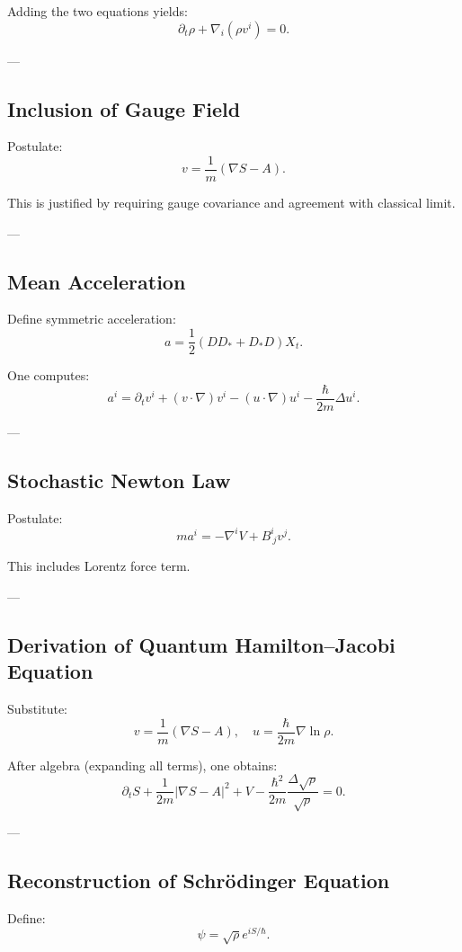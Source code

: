 Adding the two equations yields:
\[
\partial_t \rho + \nabla_i(\rho v^i) = 0.
\]

---

\subsection{Inclusion of Gauge Field}

Postulate:
\[
v = \frac{1}{m}(\nabla S - A).
\]

This is justified by requiring gauge covariance and agreement with classical limit.

---

\subsection{Mean Acceleration}

Define symmetric acceleration:
\[
a = \frac{1}{2}(D D_* + D_* D) X_t.
\]

One computes:
\[
a^i = \partial_t v^i + (v\cdot \nabla)v^i - (u\cdot \nabla)u^i - \frac{\hbar}{2m}\Delta u^i.
\]

---

\subsection{Stochastic Newton Law}

Postulate:
\[
m a^i = -\nabla^i V + B^i_{\ j} v^j.
\]

This includes Lorentz force term.

---

\subsection{Derivation of Quantum Hamilton--Jacobi Equation}

Substitute:
\[
v = \frac{1}{m}(\nabla S - A), \quad
u = \frac{\hbar}{2m}\nabla \ln \rho.
\]

After algebra (expanding all terms), one obtains:
\[
\partial_t S
+
\frac{1}{2m}|\nabla S - A|^2
+ V
- \frac{\hbar^2}{2m}\frac{\Delta \sqrt{\rho}}{\sqrt{\rho}}
= 0.
\]

---

\subsection{Reconstruction of Schr\"odinger Equation}

Define:
\[
\psi = \sqrt{\rho} e^{iS/\hbar}.
\]

